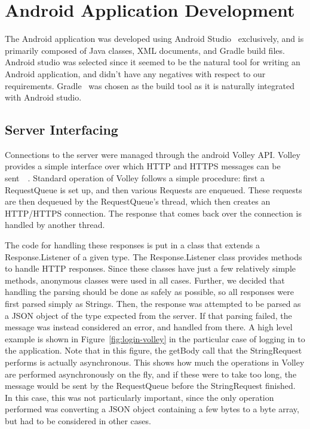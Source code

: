 \documentclass[12pt]{report}
\let\Oldsection\section
\renewcommand{\section}{\FloatBarrier\Oldsection}
\let\Oldsubsection\subsection
\renewcommand{\subsection}{\FloatBarrier\Oldsubsection}
\begin{document}

\section{Android Application Development} \label{android-application-development}

The Android application was developed using Android Studio~\autocite{ANDROIDSTUDIO} exclusively, and is primarily composed of Java classes, XML
documents, and Gradle build files. Android studio was selected since it seemed to be the natural tool for writing an
Android application, and didn't have any negatives with respect to our requirements. Gradle~\autocite{GRADLE} was chosen as the build
tool as it is naturally integrated with Android studio.


\subsection{Server Interfacing} \label{server-interfacing}

Connections to the server were managed through the android Volley API. Volley provides a simple interface over which
HTTP and HTTPS messages can be sent~\autocite{ANDROIDVOLLEY}~\autocite{VOLLEY}.
Standard operation of Volley follows a simple procedure: first a RequestQueue is
set up, and then various Requests are enqueued. These requests are then dequeued by the RequestQueue's thread, which
then creates an HTTP/HTTPS connection. The response that comes back over the connection is handled by another thread.

The code for handling these responses is put in a class that extends a Response.Listener of a given type. The
Response.Listener class provides methods to handle HTTP responses. Since these classes have just a few relatively simple
methods, anonymous classes were used in all cases. Further, we decided that handling the parsing should be done as
safely as possible, so all responses were first parsed simply as Strings. Then, the response was attempted to be parsed
as a JSON object of the type expected from the server. If that parsing failed, the message was instead considered an
error, and handled from there. A high level example is shown in Figure~\ref{fig:login-volley} in the particular case of
logging in to the application. Note that in this figure, the getBody call that the StringRequest performs is actually
asynchronous. This shows how much the operations in Volley are performed asynchronously on the fly, and if these were
to take too long, the message would be sent by the RequestQueue before the StringRequest finished. In this case, this
was not particularly important, since the only operation performed was converting a JSON object containing a few bytes
to a byte array, but had to be considered in other cases.
\end{document}
